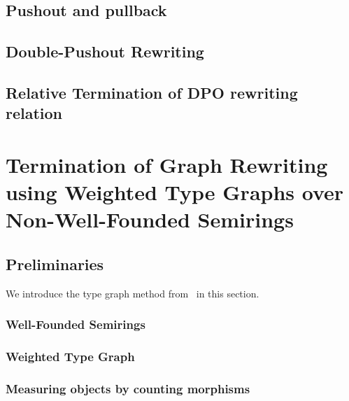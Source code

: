 \documentclass{report}
\begin{document}
\section{Pushout and pullback}  
\label{Preliminaries:Pushout}

\section{Double-Pushout Rewriting} 
\label{sec:dpo}
  
\section{Relative Termination of DPO rewriting relation} 
\label{sec:relative_termination}


\chapter{Termination of Graph Rewriting using Weighted Type Graphs over Non-Well-Founded Semirings} 
\label{chap:nwf}



\section{Preliminaries}
\label{sec:type_graph:preliminaries}
We introduce the type graph method from~\cite{endrullis2024generalized_icgt} in this section.
\subsection{Well-Founded Semirings} 
\label{sec:well_founded_semiring}

 
\subsection{Weighted Type Graph} 
\label{sec:weighted_type_graph}


\subsection{Measuring objects by counting morphisms}
\label{sec:type_graph:wf:measuring_graphs}

  
\end{document}
